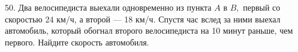 50. Два велосипедиста выехали одновременно из пункта $A$ в $B,$ первый со скоростью 24 км/ч, а второй --- 18 км/ч. Спустя час вслед за ними выехал автомобиль, который обогнал второго велосипедиста на 10 минут раньше, чем первого. Найдите скорость автомобиля.\\

